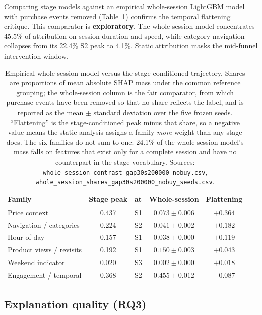 \documentclass[a4paper]{article}
\begin{document}
Comparing stage models against an empirical whole-session LightGBM model with
purchase events removed (Table~\ref{tab:whole-session}) confirms the temporal
flattening critique. This comparator is \textbf{exploratory}. The whole-session
model concentrates 45.5\% of attribution on session duration and speed, while
category navigation collapses from its 22.4\% S2 peak to 4.1\%. Static attribution
masks the mid-funnel intervention window.

\begin{table}[t]
\centering
\caption{Empirical whole-session model versus the stage-conditioned
trajectory. Shares are proportions of mean absolute SHAP mass under the common
reference grouping; the whole-session column is the fair comparator, from
which purchase events have been removed so that no share reflects the label,
and is reported as the mean $\pm$ standard deviation over the five frozen
seeds. ``Flattening'' is the stage-conditioned peak minus that share, so a
negative value means the static analysis assigns a family \emph{more} weight
than any stage does. The six families do not sum to one: 24.1\% of the
whole-session model's mass falls on features that exist only for a complete
session and have no counterpart in the stage vocabulary. Sources:
\texttt{whole\_session\_contrast\_gap30s200000\_nobuy.csv},
\texttt{whole\_session\_shares\_gap30s200000\_nobuy\_seeds.csv}.}
\label{tab:whole-session}
\small
\begin{tabular}{@{}lclcc@{}}
\toprule
\textbf{Family} & \textbf{Stage peak} & \textbf{at} &
\textbf{Whole-session} & \textbf{Flattening} \\
\midrule
Price context            & 0.437 & S1 & $0.073 \pm 0.006$ & $+0.364$ \\
Navigation / categories  & 0.224 & S2 & $0.041 \pm 0.002$ & $+0.182$ \\
Hour of day              & 0.157 & S1 & $0.038 \pm 0.000$ & $+0.119$ \\
Product views / revisits & 0.192 & S1 & $0.150 \pm 0.003$ & $+0.043$ \\
Weekend indicator        & 0.020 & S3 & $0.002 \pm 0.000$ & $+0.018$ \\
Engagement / temporal    & 0.368 & S2 & $0.455 \pm 0.012$ & $-0.087$ \\
\bottomrule
\end{tabular}
\end{table}

\subsection{Explanation quality (RQ3)}
\label{sec:results-quality}
\end{document}
